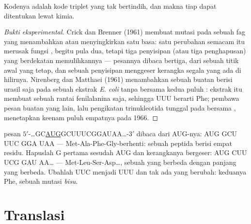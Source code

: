 \begin{proposition}\label{prop:b1:gene-expression:nirenberg}
Kodenya adalah kode triplet yang tak bertindih, dan makna tiap 
dapat ditentukan lewat kimia.
\end{proposition}
\begin{proof}[Bukti eksperimental]
Crick dan Brenner (1961) membuat mutasi pada sebuah  fag yang
menambahkan atau menyingkirkan satu basa: satu perubahan semacam itu
merusak fungsi , begitu pula dua, tetapi tiga penyisipan (atau
tiga penghapusan) yang berdekatan memulihkannya --- pesannya dibaca
bertiga, dari sebuah titik awal yang tetap, dan sebuah penyisipan
menggeser kerangka segala yang ada di hilirnya. Nirenberg dan Matthaei
(1961) menambahkan sebuah  buatan berisi urasil saja pada sebuah
ekstrak \emph{E. coli} tanpa  bersama kedua puluh :
ekstrak itu membuat sebuah rantai fenilalanina saja, sehingga UUU
berarti Phe; pembawa pesan buatan yang lain, lalu pengikatan
trinukleotida tunggal pada  bersama ,
menetapkan keenam puluh empatnya pada 1966.
\end{proof}

\begin{example}\label{ex:b1:gene-expression:reading}
 pesan $5'$-\ldots{}GC\underline{AUG}GCUUUCGGAUAA\ldots{}-$3'$
dibaca dari AUG-nya: AUG GCU UUC GGA UAA --- Met-Ala-Phe-Gly-berhenti:
sebuah peptida berisi empat residu. Hapuslah G pertama sesudah AUG dan
kerangkanya bergeser: AUG CUU UCG GAU AA\ldots{} ---
Met-Leu-Ser-Asp\ldots, sebuah  yang berbeda dengan panjang yang
berbeda. Ubahlah UUC menjadi UUU dan tak ada yang berubah: keduanya
Phe, sebuah mutasi \emph{bisu}.
\end{example}

\section{Translasi}

